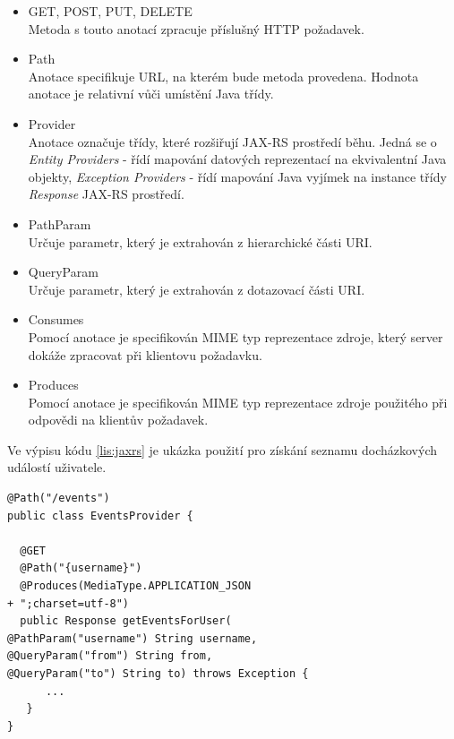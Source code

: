 \documentclass{diplomka}
\begin{document}
\begin{itemize}[noitemsep,nolistsep]
\item GET, POST, PUT, DELETE\\
Metoda s touto anotací zpracuje příslušný HTTP požadavek.
\item Path\\
Anotace specifikuje URL, na kterém bude metoda provedena. Hodnota anotace je relativní vůči umístění Java třídy. 
\item Provider\\
Anotace označuje třídy, které rozšiřují JAX-RS prostředí běhu. Jedná se o \emph{Entity Providers} - řídí mapování datových reprezentací na ekvivalentní Java objekty, \emph{Exception Providers} - řídí mapování Java vyjímek na instance třídy \emph{Response} JAX-RS prostředí.
\item PathParam\\
Určuje parametr, který je extrahován z hierarchické části URI.
\item QueryParam\\
Určuje parametr, který je extrahován z dotazovací části URI.
\item Consumes\\
Pomocí anotace je specifikován MIME typ reprezentace zdroje, který server dokáže zpracovat při klientovu požadavku.
\item Produces\\
Pomocí anotace je specifikován MIME typ reprezentace zdroje použitého při odpovědi na klientův požadavek.
\end{itemize}
Ve výpisu kódu \ref{lis:jaxrs} je ukázka použití pro získání seznamu docházkových událostí uživatele.
\newpage
\begin{lstlisting}[label=lis:jaxrs, caption=Ukázka použití JAX-RS]
@Path("/events")
public class EventsProvider {

  @GET
  @Path("{username}")
  @Produces(MediaType.APPLICATION_JSON 
+ ";charset=utf-8")
  public Response getEventsForUser(
@PathParam("username") String username, 
@QueryParam("from") String from, 
@QueryParam("to") String to) throws Exception {
      ...
   }
}
\end{lstlisting}
\end{document}
